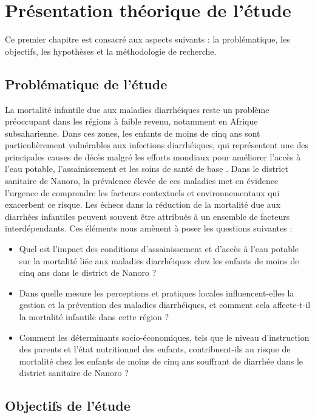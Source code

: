 \documentclass[12pt,a4paper]{report}
\begin{document}
	\newpage
	
	
	\chapter{Présentation théorique de l'étude}
	Ce premier chapitre est consacré aux aspects suivants : la problématique, les objectifs, les hypothèses et la méthodologie de recherche.
	
		\section{Problématique de l'étude}
			La mortalité infantile due aux maladies diarrhéiques reste un problème préoccupant dans les régions à faible revenu, notamment en Afrique subsaharienne. Dans ces zones, les enfants de moins de cinq ans sont particulièrement vulnérables aux infections diarrhéiques, qui représentent une des principales causes de décès malgré les efforts mondiaux pour améliorer l'accès à l'eau potable, l'assainissement et les soins de santé de base \cite{noauthor_principaux_nodate}. Dans le district sanitaire de Nanoro, la prévalence élevée de ces maladies met en évidence l'urgence de comprendre les facteurs contextuels et environnementaux qui exacerbent ce risque. Les échecs dans la réduction de la mortalité due aux diarrhées infantiles peuvent souvent être attribués à un ensemble de facteurs interdépendants.  Ces éléments nous amènent à poser les questions suivantes :
			\begin{itemize}
				\item Quel est l'impact des conditions d'assainissement et d'accès à l'eau potable sur la mortalité liée aux maladies diarrhéiques chez les enfants de moins de cinq ans dans le district de Nanoro ?
				
				\item Dans quelle mesure les perceptions et pratiques locales influencent-elles la gestion et la prévention des maladies diarrhéiques, et comment cela affecte-t-il la mortalité infantile dans cette région ?
				
				\item Comment les déterminants socio-économiques, tels que le niveau d'instruction des parents et l'état nutritionnel des enfants, contribuent-ils au risque de mortalité chez les enfants de moins de cinq ans souffrant de diarrhée dans le district sanitaire de Nanoro ?
			\end{itemize}
			
			
		\section{Objectifs de l'étude}
\end{document}
